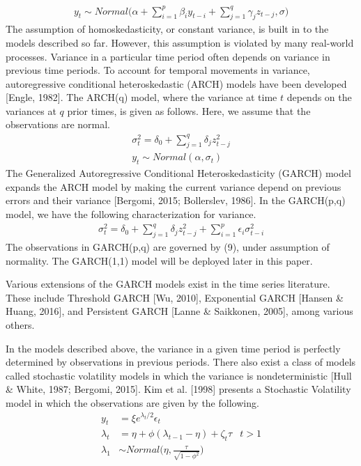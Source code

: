 \documentclass[12pt,letterpaper,reqno,fleqn]{article}
\begin{document}
\begin{align}
y_t \sim Normal \big(\alpha + \sum_{i=1}^p \beta_i y_{t-i} + \sum_{j=1}^q \gamma_j z_{t-j}, \sigma \big)
\end{align}
\hspace{.5cm} The assumption of homoskedasticity, or constant variance, is built in to the models described so far. However, this assumption is violated by many real-world processes. Variance in a particular time period often depends on variance in previous time periods. To account for temporal movements in variance, autoregressive conditional heteroskedastic (ARCH) models have been developed [Engle, 1982].
The ARCH(q) model, where the variance at time $t$ depends on the variances at $q$ prior times, is given as follows. Here, we assume that the observations are normal.
\begin{align}
\sigma^2_t = \delta_0 + \sum_{j=1}^q \delta_j z_{t-j}^2 \\
y_t \sim Normal(\alpha, \sigma_t) 
\end{align}
\hspace{.5cm} The Generalized Autoregressive Conditional Heteroskedasticity (GARCH) model expands the ARCH model by making the current variance depend on previous errors and their variance [Bergomi, 2015; Bollerslev, 1986]. In the GARCH(p,q) model, we have the following characterization for variance.
\begin{align}
\sigma^2_t = \delta_0 + \sum_{j=1}^q \delta_j z_{t-j}^2  + \sum_{i=1}^p \epsilon_i \sigma^2_{t-i}
\end{align}
The observations in GARCH(p,q) are governed by (9), under assumption of normality. The GARCH(1,1) model will be deployed later in this paper. 

Various extensions of the GARCH models exist in the time series literature. These include Threshold GARCH [Wu, 2010], Exponential GARCH [Hansen \& Huang, 2016], and Persistent GARCH [Lanne \& Saikkonen, 2005], among various others.

In the models described above, the variance in a given time period is perfectly determined by observations in previous periods. There also exist a class of models called stochastic volatility models in which the variance is nondeterministic [Hull \& White, 1987; Bergomi, 2015].
Kim et al. [1998] presents a Stochastic Volatility model in which the observations are given by the following.
\begin{align}
y_t &= \xi e^{\lambda_t/2} \epsilon_t \\
\lambda_t &= \eta + \phi(\lambda_{t-1} - \eta) + \zeta_t \tau & t>1 \\
\lambda_1 &\sim Normal \big( \eta, \frac{\tau}{\sqrt{1 - \phi^2}} \big)
\end{align}
\end{document}
